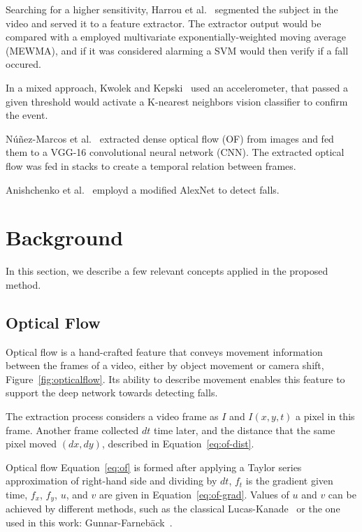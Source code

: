 \documentclass[conference]{IEEEtran}
\begin{document}
Searching for a higher sensitivity, Harrou et al.~\cite{harrou2017vision} segmented the subject in the video and served it to a feature extractor. The extractor output would be compared with a employed multivariate exponentially-weighted moving average (MEWMA), and if it was considered alarming a SVM would then verify if a fall occured.

In a mixed approach, Kwolek and Kepski~\cite{kwolek2015improving} used an accelerometer, that passed a given threshold would activate a K-nearest neighbors vision classifier to confirm the event.

N\'u\~nez-Marcos et al.~\cite{nunez2017vision} extracted dense optical flow (OF) from images and fed them to a VGG-16 convolutional neural network (CNN). The extracted optical flow was fed in stacks to create a temporal relation between frames.

Anishchenko et al.~\cite{anishchenko2018machine} employd a modified AlexNet to detect falls.

\section{Background}

In this section, we describe a few relevant concepts applied in the proposed method.

\subsection{Optical Flow}
\label{sec:opticalflow}

Optical flow is a hand-crafted feature that conveys movement information between the frames of a video, either by object movement or camera shift, Figure~\ref{fig:opticalflow}. Its ability to describe movement enables this feature to support the deep network towards detecting falls.

The extraction process considers a video frame as $I$ and $I(x, y, t)$ a pixel in this frame. Another frame collected $dt$ time later, and the distance that the same pixel moved $(dx, dy)$, described in Equation~\ref{eq:of-dist}.

Optical flow Equation~\ref{eq:of} is formed after applying a Taylor series approximation of right-hand side and dividing by $dt$, $f_t$ is the gradient given time, $f_x$, $f_y$, $u$, and $v$ are given in Equation~\ref{eq:of-grad}. Values of $u$ and $v$ can be achieved by different methods, such as the classical Lucas-Kanade~\cite{jain2018abnormal} or the one used in this work: Gunnar-Farneb{\"a}ck~\cite{lowhur2015dense}.
\end{document}
